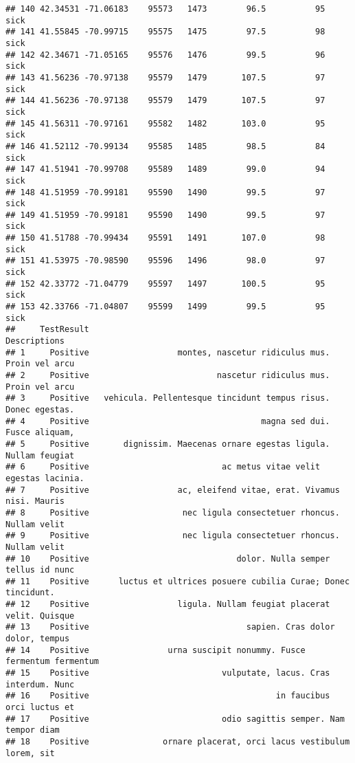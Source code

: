 \documentclass[
]{article}
\begin{document}
\begin{verbatim}
## 140 42.34531 -71.06183    95573   1473        96.5          95         sick
## 141 41.55845 -70.99715    95575   1475        97.5          98         sick
## 142 42.34671 -71.05165    95576   1476        99.5          96         sick
## 143 41.56236 -70.97138    95579   1479       107.5          97         sick
## 144 41.56236 -70.97138    95579   1479       107.5          97         sick
## 145 41.56311 -70.97161    95582   1482       103.0          95         sick
## 146 41.52112 -70.99134    95585   1485        98.5          84         sick
## 147 41.51941 -70.99708    95589   1489        99.0          94         sick
## 148 41.51959 -70.99181    95590   1490        99.5          97         sick
## 149 41.51959 -70.99181    95590   1490        99.5          97         sick
## 150 41.51788 -70.99434    95591   1491       107.0          98         sick
## 151 41.53975 -70.98590    95596   1496        98.0          97         sick
## 152 42.33772 -71.04779    95597   1497       100.5          95         sick
## 153 42.33766 -71.04807    95599   1499        99.5          95         sick
##     TestResult                                                    Descriptions
## 1     Positive                  montes, nascetur ridiculus mus. Proin vel arcu
## 2     Positive                          nascetur ridiculus mus. Proin vel arcu
## 3     Positive   vehicula. Pellentesque tincidunt tempus risus. Donec egestas.
## 4     Positive                                   magna sed dui. Fusce aliquam,
## 5     Positive       dignissim. Maecenas ornare egestas ligula. Nullam feugiat
## 6     Positive                           ac metus vitae velit egestas lacinia.
## 7     Positive                  ac, eleifend vitae, erat. Vivamus nisi. Mauris
## 8     Positive                   nec ligula consectetuer rhoncus. Nullam velit
## 9     Positive                   nec ligula consectetuer rhoncus. Nullam velit
## 10    Positive                              dolor. Nulla semper tellus id nunc
## 11    Positive      luctus et ultrices posuere cubilia Curae; Donec tincidunt.
## 12    Positive                  ligula. Nullam feugiat placerat velit. Quisque
## 13    Positive                                sapien. Cras dolor dolor, tempus
## 14    Positive                urna suscipit nonummy. Fusce fermentum fermentum
## 15    Positive                           vulputate, lacus. Cras interdum. Nunc
## 16    Positive                                      in faucibus orci luctus et
## 17    Positive                           odio sagittis semper. Nam tempor diam
## 18    Positive               ornare placerat, orci lacus vestibulum lorem, sit

\end{verbatim}
\end{document}
